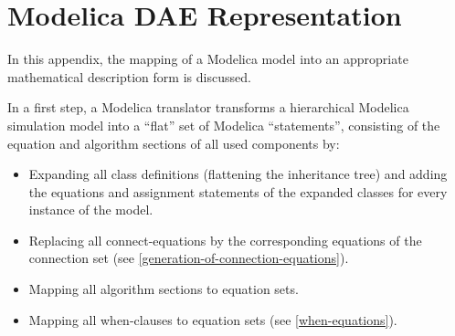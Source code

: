 \chapter{Modelica DAE Representation}\label{modelica-dae-representation}

In this appendix, the mapping of a Modelica model into an appropriate
mathematical description form is discussed.

In a first step, a Modelica translator transforms a hierarchical
Modelica simulation model into a ``flat'' set of Modelica
``statements'', consisting of the equation and algorithm sections of all
used components by:
\begin{itemize}
\item
  Expanding all class definitions (flattening the inheritance tree) and
  adding the equations and assignment statements of the expanded classes
  for every instance of the model.
\item
  Replacing all connect-equations by the corresponding equations of the
  connection set (see \cref{generation-of-connection-equations}).
\item
  Mapping all algorithm sections to equation sets.
\item
  Mapping all when-clauses to equation sets (see \cref{when-equations}).
\end{itemize}

